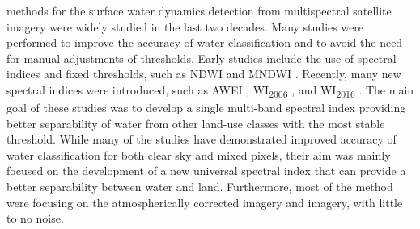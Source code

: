  methods for the surface water dynamics detection from multispectral satellite imagery were widely studied in the last two decades. Many studies were performed to improve the accuracy of water classification and to avoid the need for manual adjustments of thresholds. Early studies include the use of spectral indices and fixed thresholds, such as NDWI \citep{McFeeters1996} and MNDWI \citep{Xu2006}. Recently, many new spectral indices were introduced, such as AWEI \citep{feyisa2014automated}, WI\textsubscript{2006} \citep{homer2004development}, and WI\textsubscript{2016} \citep{fisher2016comparing}. The main goal of these studies was to develop a single multi-band spectral index providing better separability of water from other land-use classes with the most stable threshold.  While many of the studies have demonstrated improved accuracy of water classification for both clear sky and mixed pixels, their aim was mainly focused on the development of a new universal spectral index that can provide a better separability between water and land. Furthermore, most of the method were focusing on the atmospherically corrected imagery and imagery, with little to no noise. 

